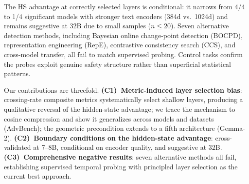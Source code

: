 The HS advantage at correctly selected layers is conditional: it narrows from 4/4 to 1/4 significant models with stronger text encoders (384d vs.\ 1024d) and remains suggestive at 32B due to small samples ($n \leq 20$). Seven alternative detection methods, including Bayesian online change-point detection (BOCPD), representation engineering (RepE), contrastive consistency search (CCS), and cross-model transfer, all fail to match supervised probing. Control tasks confirm the probes exploit genuine safety structure rather than superficial statistical patterns.

Our contributions are threefold. \textbf{(C1)~Metric-induced layer selection bias}: crossing-rate composite metrics systematically select shallow layers, producing a qualitative reversal of the hidden-state advantage; we trace the mechanism to cosine compression and show it generalizes across models and datasets (AdvBench); the geometric precondition extends to a fifth architecture (Gemma-2). \textbf{(C2)~Boundary conditions on the hidden-state advantage}: cross-validated at 7--8B, conditional on encoder quality, and suggestive at 32B. \textbf{(C3)~Comprehensive negative results}: seven alternative methods all fail, establishing supervised temporal probing with principled layer selection as the current best approach.
